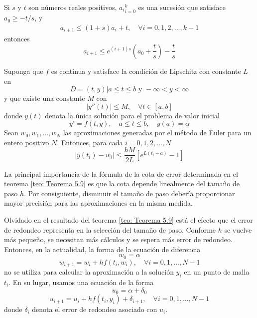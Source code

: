 \begin{lemma}
    Si $s$ y $t$ son números reales positivos, ${a_i}_{i = 0}^k$ es una sucesión que satisface $a_0 \geq -t/s$, y
    \begin{eqnarray}
        a_{i + 1} \leq (1 + s) a_i + t, \quad \forall i = 0, 1, 2, ..., k-1
    \end{eqnarray}
    entonces
    \[ a_{i + 1} \leq e^{(i + 1)s} \left( a_0 + \frac{t}{s} \right) - \frac{t}{s} \]
\end{lemma}

\begin{theorem}
    \label{teo: Teorema 5.9}
    Suponga que $f$ es continua y satisface la condición de Lipschitz con constante $L$ en 
    \[ D = {(t, y) | a \leq t \leq b \text{ y } - \infty < y < \infty} \]
    y que existe una constante $M$ con
    \[ |y''(t) | \leq M, \quad \forall t \in [a, b] \]
    donde $y(t)$ denota la única solución para el problema de valor inicial
    \[ y' = f(t, y), \quad a \leq t \leq b, \quad y(a) = \alpha \]
    Sean $w_0, w_1,..., w_N $ las aproximaciones generadas por el método de Euler para un entero positivo $N$. Entonces, para cada $i = 0, 1, 2,..., N$
    \begin{equation}
        |y(t_i) - w_i| \leq \frac{hM}{2L} \left[ e^{L(t_i - a)} - 1 \right]
    \end{equation}
\end{theorem}

La principal importancia de la fórmula de la cota de error determinada en el teorema \ref{teo: Teorema 5.9} es que la cota depende linealmente del tamaño de paso $h$. Por consiguiente, disminuir el tamaño de paso debería proporcionar mayor precisión para las aproximaciones en la misma medida.

Olvidado en el resultado del teorema \ref{teo: Teorema 5.9} está el efecto que el error de redondeo representa en la selección del tamaño de paso. Conforme $h$ se vuelve más pequeño, se necesitan más cálculos y se espera más error de redondeo. Entonces, en la actualidad, la forma de la ecuación de diferencia
\[ w_0 = \alpha \]
\[ w_{i + 1} = w_i + h f(t_i, w_i), \quad \forall i = 0, 1, ..., N - 1 \]
no se utiliza para calcular la aproximación a la solución $y_i$ en un punto de malla $t_i$. En su lugar, usamos una ecuación de la forma
\[ u_0 = \alpha + \delta_0 \]
\begin{equation}
    \label{eq: Burden 5.11}
    u_{i + 1} = u_i + h f(t_i, y_i) + \delta_{i + 1}, \quad \forall i = 0, 1, ..., N - 1
\end{equation}
donde $\delta_i$ denota el error de redondeo asociado con $u_i$.

